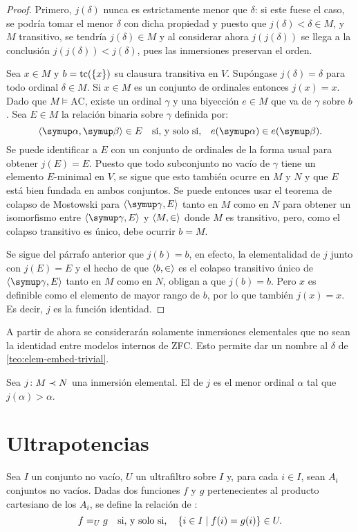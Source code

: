 \begin{proof}
    Primero, $j(\delta)$ nunca es estrictamente menor que $\delta$:
    si este fuese el caso, se podría tomar el menor $\delta$ con dicha propiedad
    y puesto que $j(\delta) < \delta \in M$, y $M$ transitivo, se tendría
    $j(\delta)\in M$ y al considerar ahora $j(j(\delta))$ se llega a la conclusión
    $j(j(\delta)) < j(\delta)$, pues las inmersiones preservan el orden.

    Sea $x\in M$ y $b = \operatorname{tc}(\left\{ x \right\})$ su clausura transitiva en $V$.
    Supóngase $j(\delta) = \delta$ para todo ordinal $\delta\in M$.
    Si $x\in M$ es un conjunto de ordinales entonces $j(x)=x$.
    Dado que $M\models \text{AC}$, existe un ordinal $\gamma$ y
    una biyección $e\in M$ que va de $\gamma$ sobre $b$.
    Sea $E\in M$ la relación binaria sobre $\gamma$ definida por:
    \[
        \op{\alpha, \beta}\in E\quad\text{si, y solo si,}\quad e(\alpha)\in e(\beta).
    \]
    Se puede identificar a $E$ con un conjunto de ordinales de la forma usual
    para obtener $j(E)=E$. Puesto que todo subconjunto no vacío de $\gamma$
    tiene un elemento $E$-minimal en $V$, se sigue que esto también ocurre en $M$ y $N$
    y que $E$ está bien fundada en ambos conjuntos.
    Se puede entonces usar el teorema de colapso de Mostowski para $\op{\gamma, E}$
    tanto en $M$ como en $N$ para obtener un isomorfismo entre $\op{\gamma, E}$
    y $\langle M,\in \rangle$ donde $M$ es transitivo, pero, como el colapso transitivo
    es único, debe ocurrir $b = M$.

    Se sigue del párrafo anterior que $j(b)=b$, en efecto,
    la elementalidad de $j$ junto con $j(E)=E$ y el hecho de que
    $\langle b,\in \rangle$ es el colapso transitivo único de $\op{\gamma, E}$
    tanto en $M$ como en $N$, obligan a que $j(b)=b$.
    Pero $x$ es definible como el elemento de mayor rango de $b$, por lo que también
    $j(x) = x$. Es decir, $j$ es la función identidad.
\end{proof}

A partir de ahora
se considerarán solamente inmersiones elementales que no sean la identidad
entre modelos internos de ZFC.
Esto permite dar un nombre al $\delta$ de \ref{teo:elem-embed-trivial}.

\begin{defi}
    Sea $j\colon M\prec N$ una inmersión elemental. El  de $j$
    es el menor ordinal $\alpha$ tal que $j(\alpha)>\alpha$.
\end{defi}

\section{Ultrapotencias}
Sea $I$ un conjunto no vacío, $U$ un ultrafiltro sobre $I$ y, para cada $i\in I$,
sean $A_i$ conjuntos no vacíos. Dadas dos funciones $f$ y $g$ pertenecientes al producto
cartesiano de los $A_i$, se define la relación de :
\[
    f=_U g \quad\text{si, y solo si,}\quad \left\{ i\in I\mid f(i)=g(i) \right\}\in U.
\]

